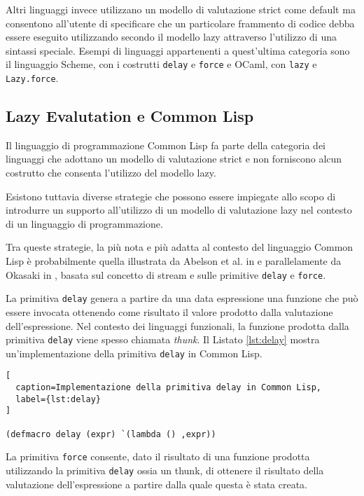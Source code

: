 Altri linguaggi invece utilizzano un modello di valutazione strict come default
ma consentono all'utente di specificare che un particolare frammento di codice
debba essere eseguito utilizzando secondo il modello lazy attraverso l'utilizzo
di una sintassi speciale. Esempi di linguaggi appartenenti a quest'ultima
categoria sono il linguaggio Scheme, con i costrutti \texttt{delay} e
\texttt{force} e OCaml, con \texttt{lazy} e \texttt{Lazy.force}.

\subsection{Lazy Evalutation e Common Lisp}
\label{lazy-eval-cl}

Il linguaggio di programmazione Common Lisp fa parte della categoria dei
linguaggi che adottano un modello di valutazione strict e non forniscono alcun
costrutto che consenta l'utilizzo del modello lazy.

Esistono tuttavia diverse strategie che possono essere impiegate allo scopo di
introdurre un supporto all'utilizzo di un modello di valutazione lazy nel
contesto di un linguaggio di programmazione.

Tra queste strategie, la più nota e più adatta al contesto del linguaggio Common
Lisp è probabilmente quella illustrata da Abelson et al. in \cite{Abelson1996} e
parallelamente da Okasaki in \cite{DBLP:conf/afp/Okasaki96}, basata sul concetto
di stream e sulle primitive \texttt{delay} e \texttt{force}.

La primitiva \texttt{delay} genera a partire da una data espressione una
funzione che può essere invocata ottenendo come risultato il valore prodotto
dalla valutazione dell'espressione. Nel contesto dei linguaggi funzionali, la
funzione prodotta dalla primitiva \texttt{delay} viene spesso chiamata
\textit{thunk}. Il Listato \ref{lst:delay} mostra un'implementazione della
primitiva \texttt{delay} in Common Lisp.

\begin{lstlisting}[
  caption=Implementazione della primitiva delay in Common Lisp,
  label={lst:delay}
]

(defmacro delay (expr) `(lambda () ,expr))

\end{lstlisting}

La primitiva \texttt{force} consente, dato il risultato di una funzione prodotta
utilizzando la primitiva \texttt{delay} ossia un thunk, di ottenere il risultato
della valutazione dell'espressione a partire dalla quale questa è stata creata.

